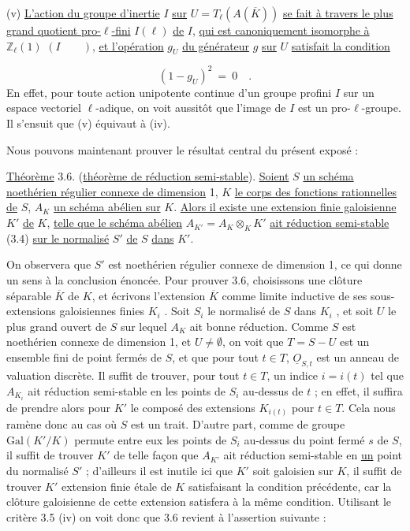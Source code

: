 (v) \underline{L'action du groupe d'inertie} $I$ \underline{sur} $U = T_\ell(A(\overline{K}))$ \underline{se fait à travers le plus grand quotient pro-$\ell$-fini} $I(\ell)$ \underline{de} $I$, \underline{qui est canoniquement isomorphe à} $\mathbb{Z}_\ell(1)$ $(I \qquad )$, \underline{et l'opération} $g_U$ \underline{du générateur} $g$ \underline{sur} $U$ \underline{satisfait la condition}

\begin{equation}\tag{3.5.3}
(1 - g_U)^2 \ = \ 0 \quad .
\end{equation}
En effet, pour toute action unipotente continue d'un groupe profini $I$ sur un espace vectoriel $\ell$-adique, on voit aussitôt que l'image de $I$ est un pro-$\ell$-groupe. Il s'ensuit que (v) équivaut à (iv).

Nous pouvons maintenant prouver le résultat central du présent exposé :

\underline{Théorème} 3.6. (\underline{théorème de réduction semi-stable}). \underline{Soient} $S$ \underline{un schéma noethérien régulier connexe de dimension} 1, $K$ \underline{le corps des fonctions rationnelles de} $S$, $A_K$ \underline{un schéma abélien sur} $K$. \underline{Alors il existe une extension finie galoisienne} $K'$ \underline{de} $K$, \underline{telle que le schéma abélien} $A_{K'} = A_K \otimes_K K'$ \underline{ait réduction semi-stable} (3.4) \underline{sur le normalisé} $S'$ \underline{de} $S$ \underline{dans} $K'$.



On observera que $S'$ est noethérien régulier connexe de dimension 1, ce qui donne un sens à la conclusion énoncée. Pour prouver 3.6, choisissons une clôture séparable $\overline{K}$ de $K$, et écrivons l'extension $\overline{K}$ comme limite inductive de ses sous-extensions galoisiennes finies $K_i$ . Soit $S_i$ le normalisé de $S$ dans $K_i$ , et soit $U$ le plus grand ouvert de $S$ sur lequel $A_K$ ait bonne réduction. Comme $S$ est noethérien connexe de dimension 1, et $U \neq \emptyset$, on voit que $T = S-U$ est un ensemble fini de point fermés de $S$, et que pour tout $t \in T$, $\underline{O}_{S,t}$ est un anneau de valuation discrète. Il suffit de trouver, pour tout $t \in T$, un indice $i = i(t)$ tel que $A_{K_i}$ ait réduction semi-stable en les points de $S_i$ au-dessus de $t$ ; en effet, il suffira de prendre alors pour $K'$ le composé des extensions $K_{i(t)}$ pour $t \in T$. Cela nous ramène donc au cas où $S$ est un trait. D'autre part, comme de groupe $\mathrm{Gal}(K'/K)$ permute entre eux les points de $S_i$ au-dessus du point fermé $s$ de $S$, il suffit de trouver $K'$ de telle façon que $A_{K'}$ ait réduction semi-stable en \underline{un} point du normalisé $S'$ ; d'ailleurs il est inutile ici que $K'$ soit galoisien sur $K$, il suffit de trouver $K'$ extension finie étale de $K$ satisfaisant la condition précédente, car la clôture galoisienne de cette extension satisfera à la même condition. Utilisant le critère 3.5 (iv) on voit donc que 3.6 revient à l'assertion suivante :

